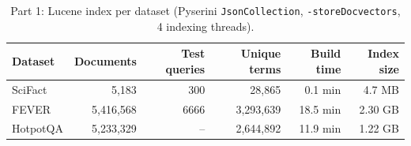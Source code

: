 \begin{table}[ht]\centering\small
\begin{tabular}{lrrrrr}\toprule
Dataset & Documents & Test queries & Unique terms & Build time & Index size \\ \midrule
SciFact & 5,183 & 300 & 28,865 & 0.1 min & 4.7 MB \\
FEVER & 5,416,568 & 6666 & 3,293,639 & 18.5 min & 2.30 GB \\
HotpotQA & 5,233,329 & -- & 2,644,892 & 11.9 min & 1.22 GB \\
\bottomrule\end{tabular}
\caption{Part 1: Lucene index per dataset (Pyserini \texttt{JsonCollection}, \texttt{-storeDocvectors}, 4 indexing threads).}\label{tab:part1}\end{table}
